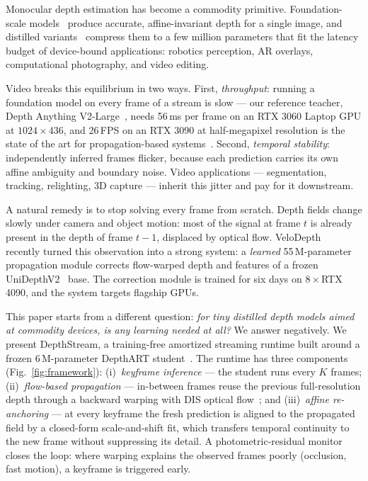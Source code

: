 \documentclass[10pt,twocolumn]{article}
\begin{document}
Monocular depth estimation has become a commodity primitive. Foundation-scale
models~\cite{dav2,midas,metric3d,unidepth} produce accurate, affine-invariant
depth for a single image, and distilled variants~\cite{depthart,fastdepth}
compress them to a few million parameters that fit the latency budget of
device-bound applications: robotics perception, AR overlays, computational
photography, and video editing.

Video breaks this equilibrium in two ways. First, \emph{throughput}: running a
foundation model on every frame of a stream is slow --- our reference teacher,
Depth Anything V2-Large~\cite{dav2}, needs 56\,ms per frame on an RTX 3060
Laptop GPU at $1024{\times}436$, and 26\,FPS on an RTX 3090 at half-megapixel
resolution is the state of the art for propagation-based
systems~\cite{velodepth}. Second, \emph{temporal stability}: independently
inferred frames flicker, because each prediction carries its own affine
ambiguity and boundary noise. Video applications --- segmentation, tracking,
relighting, 3D capture --- inherit this jitter and pay for it downstream.

A natural remedy is to stop solving every frame from scratch. Depth fields
change slowly under camera and object motion: most of the signal at frame $t$
is already present in the depth of frame $t{-}1$, displaced by optical flow.
VeloDepth~\cite{velodepth} recently turned this observation into a strong
system: a \emph{learned} 55\,M-parameter propagation module corrects
flow-warped depth and features of a frozen UniDepthV2~\cite{unidepth} base.
The correction module is trained for six days on $8\times$RTX\,4090, and the
system targets flagship GPUs.

This paper starts from a different question: \emph{for tiny distilled depth
models aimed at commodity devices, is any learning needed at all?} We answer
negatively. We present DepthStream, a training-free amortized streaming runtime
built around a frozen 6\,M-parameter DepthART student~\cite{depthart}. The
runtime has three components (Fig.~\ref{fig:framework}): (i)~\emph{keyframe
inference} --- the student runs every $K$ frames; (ii)~\emph{flow-based
propagation} --- in-between frames reuse the previous full-resolution depth
through a backward warping with DIS optical flow~\cite{disflow}; and
(iii)~\emph{affine re-anchoring} --- at every keyframe the fresh prediction is
aligned to the propagated field by a closed-form scale-and-shift fit, which
transfers temporal continuity to the new frame without suppressing its detail.
A photometric-residual monitor closes the loop: where warping explains the
observed frames poorly (occlusion, fast motion), a keyframe is triggered early.
\end{document}
